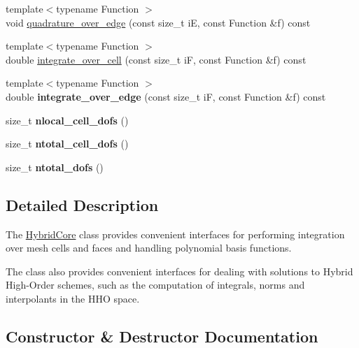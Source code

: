 \begin{DoxyCompactItemize}
{\footnotesize template$<$typename Function $>$ }\\void \hyperlink{classMeshFramework2D_1_1HybridCore_a4354cc25879093b3a1dcd0efe7e2e07a}{quadrature\+\_\+over\+\_\+edge} (const size\+\_\+t iE, const Function \&f) const
\item 
{\footnotesize template$<$typename Function $>$ }\\double \hyperlink{classMeshFramework2D_1_1HybridCore_a7b4f67367d7b3fd016369aebd006b8aa}{integrate\+\_\+over\+\_\+cell} (const size\+\_\+t iF, const Function \&f) const
\item 
\mbox{\label{classMeshFramework2D_1_1HybridCore_af2dcd1b81c27dff31f054ab1d4fcad2c}} 
{\footnotesize template$<$typename Function $>$ }\\double {\bfseries integrate\+\_\+over\+\_\+edge} (const size\+\_\+t iF, const Function \&f) const
\item 
\mbox{\label{classMeshFramework2D_1_1HybridCore_aff52b273cb899d37f099ac95c4ebdcfb}} 
size\+\_\+t {\bfseries nlocal\+\_\+cell\+\_\+dofs} ()
\item 
\mbox{\label{classMeshFramework2D_1_1HybridCore_a4c43389b8464bbca85d1f42e02270306}} 
size\+\_\+t {\bfseries ntotal\+\_\+cell\+\_\+dofs} ()
\item 
\mbox{\label{classMeshFramework2D_1_1HybridCore_a6ac5e2d17f0ba51d14ce68c3ba88782c}} 
size\+\_\+t {\bfseries ntotal\+\_\+dofs} ()
\end{DoxyCompactItemize}


\subsection{Detailed Description}
The \hyperlink{classMeshFramework2D_1_1HybridCore}{Hybrid\+Core} class provides convenient interfaces for performing integration over mesh cells and faces and handling polynomial basis functions. 

The class also provides convenient interfaces for dealing with solutions to Hybrid High-\/\+Order schemes, such as the computation of integrals, norms and interpolants in the H\+HO space. 

\subsection{Constructor \& Destructor Documentation}
\mbox{\label{classMeshFramework2D_1_1HybridCore_ab4fc16145e01888229f1ce27e31ccea9}} 
